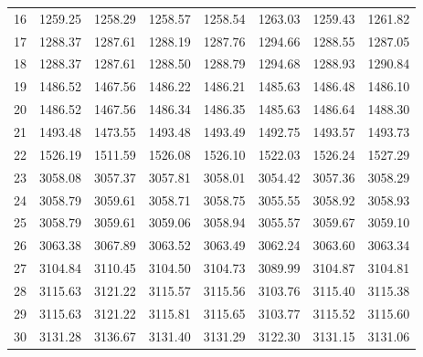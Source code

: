 \documentclass[10pt,oneside]{article}
\begin{document}
\begin{table}[h!]
\begin{tabular}{cccccccc}
16 &   1259.25 & 1258.29 & 1258.57 & 1258.54 &      1263.03 & 1259.43 & 1261.82 \\
17 &   1288.37 & 1287.61 & 1288.19 & 1287.76 &      1294.66 & 1288.55 & 1287.05 \\
18 &   1288.37 & 1287.61 & 1288.50 & 1288.79 &      1294.68 & 1288.93 & 1290.84 \\
19 &   1486.52 & 1467.56 & 1486.22 & 1486.21 &      1485.63 & 1486.48 & 1486.10 \\
20 &   1486.52 & 1467.56 & 1486.34 & 1486.35 &      1485.63 & 1486.64 & 1488.30 \\
21 &   1493.48 & 1473.55 & 1493.48 & 1493.49 &      1492.75 & 1493.57 & 1493.73 \\
22 &   1526.19 & 1511.59 & 1526.08 & 1526.10 &      1522.03 & 1526.24 & 1527.29 \\
23 &   3058.08 & 3057.37 & 3057.81 & 3058.01 &      3054.42 & 3057.36 & 3058.29 \\
24 &   3058.79 & 3059.61 & 3058.71 & 3058.75 &      3055.55 & 3058.92 & 3058.93 \\
25 &   3058.79 & 3059.61 & 3059.06 & 3058.94 &      3055.57 & 3059.67 & 3059.10 \\
26 &   3063.38 & 3067.89 & 3063.52 & 3063.49 &      3062.24 & 3063.60 & 3063.34 \\
27 &   3104.84 & 3110.45 & 3104.50 & 3104.73 &      3089.99 & 3104.87 & 3104.81 \\
28 &   3115.63 & 3121.22 & 3115.57 & 3115.56 &      3103.76 & 3115.40 & 3115.38 \\
29 &   3115.63 & 3121.22 & 3115.81 & 3115.65 &      3103.77 & 3115.52 & 3115.60 \\
30 &   3131.28 & 3136.67 & 3131.40 & 3131.29 &      3122.30 & 3131.15 & 3131.06 \\
\bottomrule
\end{tabular}
\end{table}

\clearpage
\end{document}
